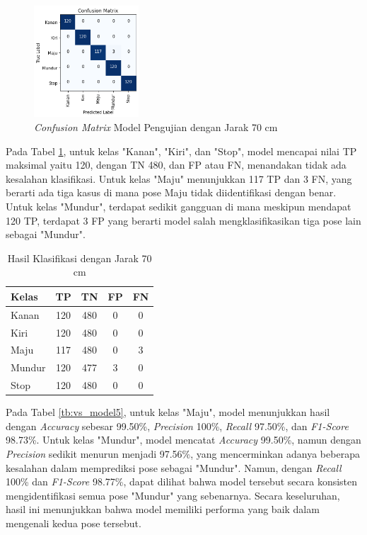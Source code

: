 \begin{figure} [H] \centering
  \includegraphics[width=0.35\textwidth]{gambar/bab4/model8 (90cm)/matrix.png}
  \caption{\emph{Confusion Matrix} Model Pengujian dengan Jarak 70 cm}
  \label{fig:matrix5}
\end{figure}

Pada Tabel \ref{tb:cm_model5}, untuk kelas "Kanan", "Kiri", dan "Stop", model mencapai nilai TP maksimal yaitu 120, dengan TN 480, dan FP atau FN, menandakan tidak ada kesalahan klasifikasi. Untuk kelas "Maju" menunjukkan 117 TP dan 3 FN, yang berarti ada tiga kasus di mana pose Maju tidak diidentifikasi dengan benar. Untuk kelas "Mundur", terdapat sedikit gangguan di mana meskipun mendapat 120 TP, terdapat 3 FP yang berarti model salah mengklasifikasikan tiga pose lain sebagai "Mundur".

\begin{longtable}{|l|c|c|c|c|}
  \caption{Hasil Klasifikasi dengan Jarak 70 cm}
  \label{tb:cm_model5} \\
  \hline
  \rowcolor[HTML]{C0C0C0} 
  \textbf{Kelas} & \textbf{TP} & \textbf{TN} & \textbf{FP} & \textbf{FN} \\ \hline
  Kanan    & 120          & 480         & 0           & 0           \\ \hline
  Kiri      & 120          & 480         & 0           & 0           \\ \hline
  Maju      & 117          & 480         & 0           & 3           \\ \hline
  Mundur     & 120          & 477         & 3           & 0           \\ \hline
  Stop  & 120          & 480         & 0           & 0           \\ \hline
\end{longtable}


Pada Tabel \ref{tb:vs_model5}, untuk kelas "Maju", model menunjukkan hasil dengan \emph{Accuracy} sebesar 99.50\%, \emph{Precision} 100\%, \emph{Recall} 97.50\%, dan \emph{F1-Score} 98.73\%. Untuk kelas "Mundur", model mencatat \emph{Accuracy} 99.50\%, namun dengan \emph{Precision} sedikit menurun menjadi 97.56\%, yang mencerminkan adanya beberapa kesalahan dalam memprediksi pose sebagai "Mundur". Namun, dengan \emph{Recall} 100\% dan \emph{F1-Score} 98.77\%, dapat dilihat bahwa model tersebut secara konsisten mengidentifikasi semua pose "Mundur" yang sebenarnya. Secara keseluruhan, hasil ini menunjukkan bahwa model memiliki performa yang baik dalam mengenali kedua pose tersebut.

